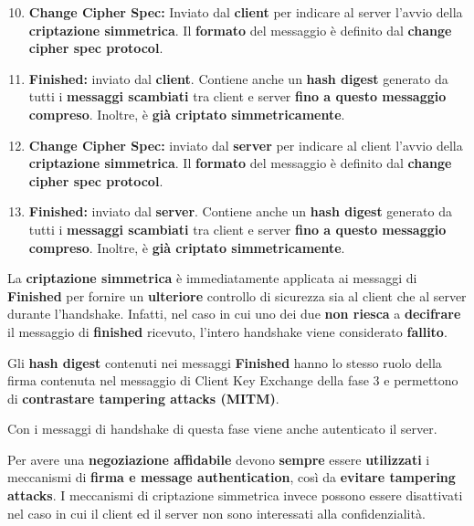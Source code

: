 \begin{definition}
\begin{enumerate}\setcounter{enumi}{9}
    \item \textbf{Change Cipher Spec:} Inviato dal \textbf{client} per indicare al server l'avvio della \textbf{criptazione simmetrica}. Il \textbf{formato} del messaggio è definito dal \textbf{change cipher spec protocol}.
    \item \textbf{Finished:} inviato dal \textbf{client}. Contiene anche un \textbf{hash digest} generato da tutti i \textbf{messaggi scambiati} tra client e server \textbf{fino a questo messaggio compreso}. Inoltre, è \textbf{già criptato simmetricamente}.
    \item \textbf{Change Cipher Spec:} inviato dal \textbf{server} per indicare al client l'avvio della \textbf{criptazione simmetrica}. Il \textbf{formato} del messaggio è definito dal \textbf{change cipher spec protocol}.
    \item \textbf{Finished:} inviato dal \textbf{server}. Contiene anche un \textbf{hash digest} generato da tutti i \textbf{messaggi scambiati} tra client e server \textbf{fino a questo messaggio compreso}. Inoltre, è \textbf{già criptato simmetricamente}.
\end{enumerate}
\end{definition}
\begin{remark}
La \textbf{criptazione simmetrica} è immediatamente applicata ai messaggi di \textbf{Finished} per fornire un \textbf{ulteriore} controllo di sicurezza sia al client che al server durante l'handshake. Infatti, nel caso in cui uno dei due \textbf{non riesca} a \textbf{decifrare} il messaggio di \textbf{finished} ricevuto, l'intero handshake viene considerato \textbf{fallito}.
\end{remark}
\begin{remark}
Gli \textbf{hash digest} contenuti nei messaggi \textbf{Finished} hanno lo stesso ruolo della firma contenuta nel messaggio di Client Key Exchange della fase 3 e permettono di \textbf{contrastare tampering attacks (MITM)}.
\end{remark}
\begin{remark}
Con i messaggi di handshake di questa fase viene anche autenticato il server.
\end{remark}
\begin{remark}
Per avere una \textbf{negoziazione affidabile} devono \textbf{sempre} essere \textbf{utilizzati} i meccanismi di \textbf{firma e message authentication}, così da \textbf{evitare tampering attacks}. I meccanismi di criptazione simmetrica invece possono essere disattivati nel caso in cui il client ed il server non sono interessati alla confidenzialità.
\end{remark}
